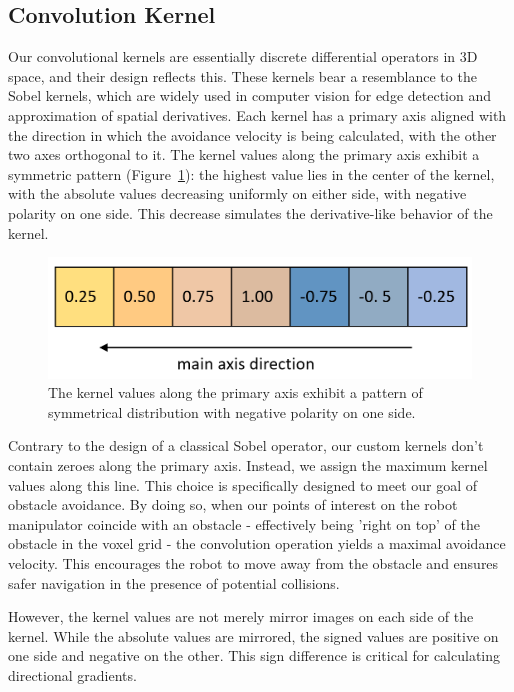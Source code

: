 \documentclass[a4paper]{article}
\begin{document}
\subsection{Convolution Kernel}

Our convolutional kernels are essentially discrete differential operators in 3D space, and their design reflects this. These kernels bear a resemblance to the Sobel kernels, which are widely used in computer vision for edge detection and approximation of spatial derivatives. Each kernel has a primary axis aligned with the direction in which the avoidance velocity is being calculated, with the other two axes orthogonal to it. The kernel values along the primary axis exhibit a symmetric pattern (Figure~\ref{Kernel main axis}): the highest value lies in the center of the kernel, with the absolute values decreasing uniformly on either side, with negative polarity on one side. This decrease simulates the derivative-like behavior of the kernel.

\begin{figure}[H]
	\centering
	\includegraphics[width=0.8\linewidth]{kernel-mainvalues-colored.png}
	\caption{The kernel values along the primary axis exhibit a pattern of symmetrical distribution with negative polarity on one side.} 
	\label{Kernel main axis}
\end{figure}

Contrary to the design of a classical Sobel operator, our custom kernels don't contain zeroes along the primary axis. Instead, we assign the maximum kernel values along this line. This choice is specifically designed to meet our goal of obstacle avoidance. By doing so, when our points of interest on the robot manipulator coincide with an obstacle - effectively being 'right on top' of the obstacle in the voxel grid - the convolution operation yields a maximal avoidance velocity. This encourages the robot to move away from the obstacle and ensures safer navigation in the presence of potential collisions.

However, the kernel values are not merely mirror images on each side of the kernel. While the absolute values are mirrored, the signed values are positive on one side and negative on the other. This sign difference is critical for calculating directional gradients.
\end{document}
